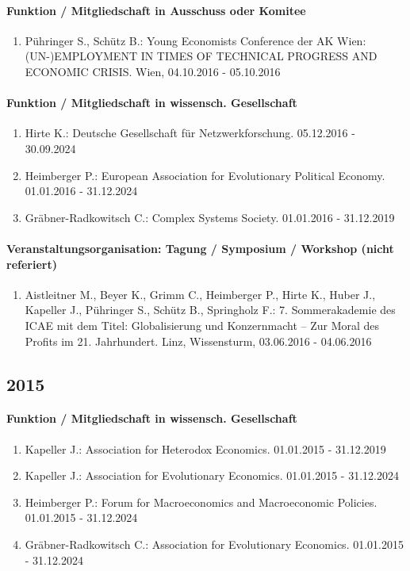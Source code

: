 \paragraph{Funktion / Mitgliedschaft in Ausschuss oder Komitee}
\begin{enumerate}[leftmargin=*, labelsep=0.5cm]
\item Pühringer S., Schütz B.: Young Economists Conference der AK Wien: (UN-)EMPLOYMENT IN TIMES OF TECHNICAL PROGRESS AND ECONOMIC CRISIS. Wien, 04.10.2016 - 05.10.2016
\end{enumerate}
\paragraph{Funktion / Mitgliedschaft in wissensch. Gesellschaft}
\begin{enumerate}[leftmargin=*, labelsep=0.5cm]
\item Hirte K.: Deutsche Gesellschaft für Netzwerkforschung. 05.12.2016 - 30.09.2024
\item Heimberger P.: European Association for Evolutionary Political Economy. 01.01.2016 - 31.12.2024
\item Gräbner-Radkowitsch C.: Complex Systems Society. 01.01.2016 - 31.12.2019
\end{enumerate}
\paragraph{Veranstaltungsorganisation: Tagung / Symposium / Workshop (nicht referiert)}
\begin{enumerate}[leftmargin=*, labelsep=0.5cm]
\item Aistleitner M., Beyer K., Grimm C., Heimberger P., Hirte K., Huber J., Kapeller J., Pühringer S., Schütz B., Springholz F.: 7. Sommerakademie des ICAE mit dem Titel: Globalisierung und Konzernmacht – Zur Moral des Profits im 21. Jahrhundert. Linz, Wissensturm, 03.06.2016 - 04.06.2016
\end{enumerate}\subsection*{2015}\paragraph{Funktion / Mitgliedschaft in wissensch. Gesellschaft}
\begin{enumerate}[leftmargin=*, labelsep=0.5cm]
\item Kapeller J.: Association for Heterodox Economics. 01.01.2015 - 31.12.2019
\item Kapeller J.: Association for Evolutionary Economics. 01.01.2015 - 31.12.2024
\item Heimberger P.: Forum for Macroeconomics and Macroeconomic Policies. 01.01.2015 - 31.12.2024
\item Gräbner-Radkowitsch C.: Association for Evolutionary Economics. 01.01.2015 - 31.12.2024
\end{enumerate}
